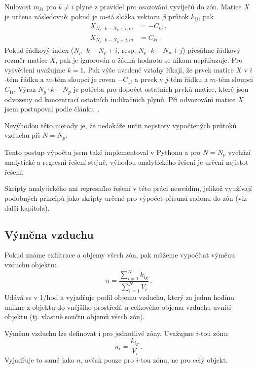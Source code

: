 Nulovost $m_{ki}$ pro $k\neq i$ plyne z pravidel pro osazování vyvíječů do zón. Matice $X$ je určena následovně: pokud je $m$-tá složka vektoru $\beta$ průtok $k_{ij}$, pak 
\begin{align}
    X_{N_p\cdot k-N_p+i,m}&=-C_{ki}\,,\\
    X_{N_p\cdot k-N_p+j,m}&=C_{ki}\,.
\end{align}
Pokud řádkový index ($N_p\cdot k-N_p+i$, resp. $N_p\cdot k-N_p+j$) přesáhne řádkový rozměr matice $X$, pak je ignorován a žádná hodnota se nikam nepřiřazuje. Pro vysvětlení uvažujme $k=1$. Pak výše uvedené vztahy říkají, že prvek matice $X$ v $i$-tém řádku a $m$-tém sloupci je roven $-C_{1i}$ a prvek v $j$-tém řádku a $m$-tém sloupci $C_{1i}$. Výraz $N_p\cdot k-N_p$ je potřeba pro dopočet ostatních prvků matice, které jsou odvozeny od koncentrací ostatních indikačních plynů. Při odvozování matice $X$ jsem postupoval podle článku~\cite{japonci2}.

Nevýhodou této metody je, že nedokáže určit nejistoty vypočtených průtoků vzduchu při $N=N_{p}$. 

Tento postup výpočtu jsem také implementoval v Pythonu a pro $N=N_{p}$ vychází analytické a regresní řešení stejně, výhodou analytického řešení je určení nejistot řešení. 

Skripty analytického ani regresního řešení v této práci neuvádím, jelikož využívají podobných principů jako skripty určené pro výpočet přísunů radonu do zón (viz další kapitola).

\subsection{Výměna vzduchu}
Pokud známe exfiltrace a objemy všech zón, pak můžeme vypočítat výměnu vzduchu objektu:
\begin{equation}
    n=\frac{\sum_{i=1}^N k_{i_E}}{\sum_{i=1}^N V_i}\,.
    \label{eq:prutoky_n}
\end{equation}
Udává se v \si{1/hod} a vyjadřuje podíl objemu vzduchu, který za jednu hodinu unikne z objektu do vnějšího prostředí, a celkového objemu vzduchu uvnitř objektu (tj. vlastně součtu objemů všech zón).

Výměnu vzduchu lze definovat i pro jednotlivé zóny. Uvažujme $i$-tou zónu:
\begin{equation}
    n_i=\frac{k_{i_E}}{V_i}\,.
    \label{eq:prutoky_n_jednaZona}
\end{equation}
Vyjadřuje to samé jako $n$, avšak pouze pro $i$-tou zónu, ne pro celý objekt.
